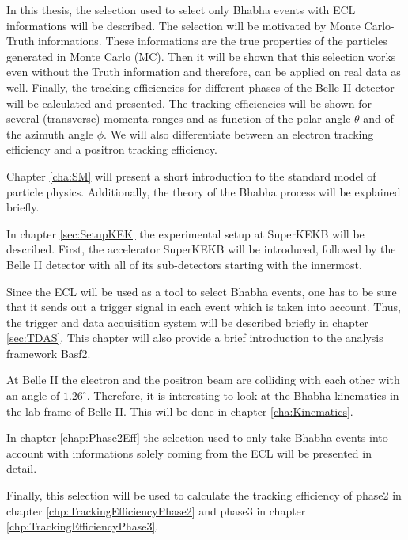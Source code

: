 \documentclass[a4paper,11pt,twosided,final,german,openbib,pdftex,listof=totoc,bibliography=totoc]{scrbook}
\begin{document}
In this thesis, the selection used to select only Bhabha events with ECL informations will be described. The selection will be motivated by Monte Carlo-Truth informations. These informations are the true properties of the particles generated in Monte Carlo (MC). Then it will be shown that this selection works even without the Truth information and therefore, can be applied on real data as well. Finally, the tracking efficiencies for different phases of the Belle II detector will be calculated and presented. The tracking efficiencies will be shown for several (transverse) momenta ranges and as function of the polar angle $\theta$ and of the azimuth angle $\phi$. We will also differentiate between an electron tracking efficiency and a positron tracking efficiency.
\newline




Chapter \ref{cha:SM} will present a short introduction to the standard model of particle physics. Additionally, the theory of the Bhabha process will be explained briefly. 

In chapter \ref{sec:SetupKEK} the experimental setup at SuperKEKB will be described. First, the accelerator SuperKEKB will be introduced, followed by the Belle II detector with all of its sub-detectors starting with the innermost.

Since the ECL will be used as a tool to select Bhabha events, one has to be sure that it sends out a trigger signal in each event which is taken into account. Thus, the trigger and data acquisition system will be described briefly in chapter \ref{sec:TDAS}. This chapter will also provide a brief introduction to the analysis framework Basf2.   


At Belle II the electron and the positron beam are colliding with each other with an angle of $1.26^{\circ}$. Therefore, it is interesting to look at the Bhabha kinematics in the lab frame of Belle II. This will be done in chapter \ref{cha:Kinematics}.

In chapter \ref{chap:Phase2Eff} the selection used to only take Bhabha events into account with informations solely coming from the ECL will be presented in detail. 

Finally, this selection will be used to calculate the tracking efficiency of phase2 in chapter \ref{chp:TrackingEfficiencyPhase2} and phase3 in chapter \ref{chp:TrackingEfficiencyPhase3}.
\end{document}
